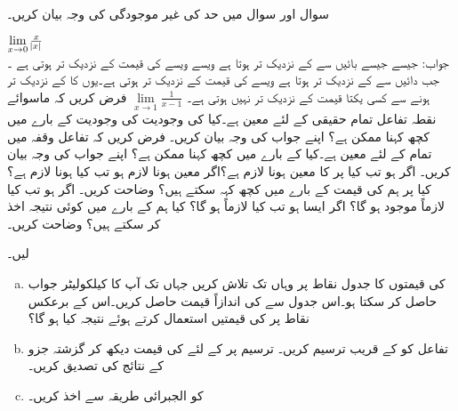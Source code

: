 
سوال  اور سوال  میں حد کی غیر موجودگی کی وجہ بیان کریں۔

$\lim\limits_{x \to 0}\tfrac{x}{\abs{x}}$\\
جواب: جیسے جیسے  بائیں سے  کے نزدیک تر ہوتا ہے ویسے ویسے  کی قیمت  کے نزدیک تر ہوتی ہے ۔جب  دائیں سے  کے نزدیک تر ہوتا ہے ویسے  کی قیمت  کے نزدیک تر ہوتی ہے۔یوں  کا  کے نزدیک تر ہونے سے   کسی یکتا قیمت کے نزدیک تر نہیں ہوتی ہے۔ 
$\lim\limits_{x \to 1}\tfrac{1}{x-1}$
فرض کریں کہ ماسوائے نقطہ  تفاعل  تمام حقیقی  کے لئے معین ہے۔کیا  کی وجودیت کی وجودیت کے بارے میں کچھ کہنا ممکن ہے؟ اپنے جواب کی وجہ بیان کریں۔ 
فرض کریں کہ  تفاعل  وقفہ  میں تمام   کے لئے معین ہے۔کیا  کے بارے میں کچھ کہنا ممکن ہے؟ اپنے جواب کی وجہ بیان کریں۔ 
اگر  ہو تب کیا  پر  کا معین ہونا لازم ہے؟اگر معین ہونا لازم ہو تب کیا  ہونا لازم ہے؟ کیا  پر ہم  کی قیمت کے بارے میں کچھ کہہ سکتے ہیں؟ وضاحت کریں۔
اگر  ہو تب کیا  لازماً موجود ہو گا؟ اگر ایسا ہو تب کیا  لازماً ہو گا؟ کیا ہم   کے بارے میں کوئی نتیجہ اخذ کر سکتے ہیں؟ وضاحت کریں۔


 لیں۔
\begin{enumerate}[a.]
\item
{} کی قیمتوں کا جدول نقاط  پر وہاں تک تلاش کریں جہاں تک آپ کا کیلکولیٹر جواب حاصل کر سکتا ہو۔اس جدول سے  کی اندازاً قیمت حاصل کریں۔اس کے برعکس نقاط  پر  کی قیمتیں استعمال کرتے ہوئے نتیجہ کیا ہو گا؟
\item
تفاعل کو  کے قریب ترسیم کریں۔ ترسیم پر  کے لئے  کی قیمت دیکھ کر  گزشتہ جزو کے نتائج کی تصدیق کریں۔ 
\item
{} کو الجبرائی طریقہ سے اخذ کریں۔
\end{enumerate}

